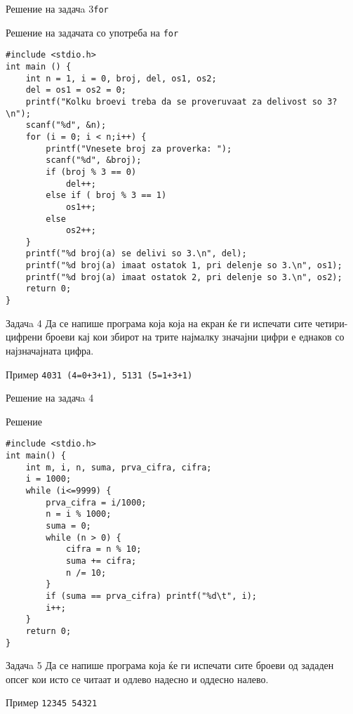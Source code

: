 \begin{frame}[fragile]{Решение на задачa 3}{\texttt{for}}
\begin{exampleblock}{Решение на задачата со употреба на \texttt{for}}
\begin{lstlisting}
#include <stdio.h> 
int main () { 
    int n = 1, i = 0, broj, del, os1, os2; 
    del = os1 = os2 = 0; 
    printf("Kolku broevi treba da se proveruvaat za delivost so 3?\n"); 
    scanf("%d", &n); 
    for (i = 0; i < n;i++) { 
        printf("Vnesete broj za proverka: "); 
        scanf("%d", &broj); 
        if (broj % 3 == 0) 
            del++; 
        else if ( broj % 3 == 1) 
            os1++; 
        else 
            os2++; 
    }
    printf("%d broj(a) se delivi so 3.\n", del); 
    printf("%d broj(a) imaat ostatok 1, pri delenje so 3.\n", os1); 
    printf("%d broj(a) imaat ostatok 2, pri delenje so 3.\n", os2); 
    return 0; 
}
\end{lstlisting}
\end{exampleblock}
\end{frame}

\begin{frame}[fragile]{Задачa 4}
Да се напише програма која која на екран ќе ги испечати сите четири-цифрени броеви кај кои збирот на трите 
најмалку значајни цифри е еднаков со најзначајната цифра.
\begin{exampleblock}{Пример}
	\texttt{4031 (4=0+3+1), 5131 (5=1+3+1)}
\end{exampleblock}
\end{frame}

\begin{frame}[fragile]{Решение на задачa 4}
\begin{exampleblock}{Решение}
	\begin{lstlisting}
#include <stdio.h> 
int main() { 
    int m, i, n, suma, prva_cifra, cifra; 
    i = 1000; 
    while (i<=9999) { 
        prva_cifra = i/1000; 
        n = i % 1000; 
        suma = 0; 
        while (n > 0) { 
            cifra = n % 10; 
            suma += cifra; 
            n /= 10; 
        } 
        if (suma == prva_cifra) printf("%d\t", i); 
        i++; 
    } 
    return 0; 
}
	\end{lstlisting}
\end{exampleblock}
\end{frame}

\begin{frame}[fragile]{Задачa 5}
Да се напише програма која ќе ги испечати сите броеви од зададен опсег кои исто
се читаат и одлево надесно и оддесно налево.
\begin{exampleblock}{Пример}
\texttt{12345    54321}
\end{exampleblock}
\end{frame}


